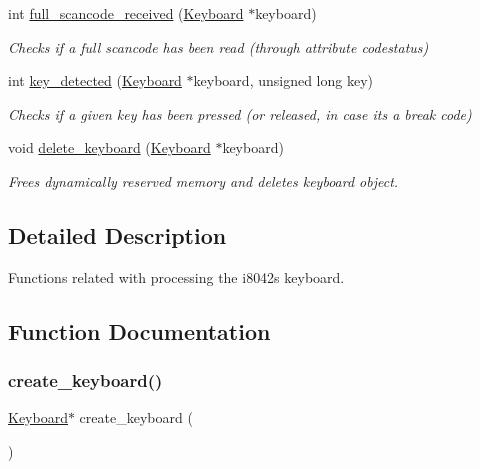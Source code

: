 \begin{DoxyCompactItemize}
int \hyperlink{group__keyboard_gacd892a0b56fcd859cc2ed0bc17e32d7f}{full\+\_\+scancode\+\_\+received} (\hyperlink{struct_keyboard}{Keyboard} $\ast$keyboard)
\begin{DoxyCompactList}\small\item\em Checks if a full scancode has been read (through attribute codestatus) \end{DoxyCompactList}\item 
int \hyperlink{group__keyboard_gaa472854b178776886c9bf568945db9c6}{key\+\_\+detected} (\hyperlink{struct_keyboard}{Keyboard} $\ast$keyboard, unsigned long key)
\begin{DoxyCompactList}\small\item\em Checks if a given key has been pressed (or released, in case it\textquotesingle{}s a break code) \end{DoxyCompactList}\item 
void \hyperlink{group__keyboard_ga8cbe117a33793a5f88056d37164af0a8}{delete\+\_\+keyboard} (\hyperlink{struct_keyboard}{Keyboard} $\ast$keyboard)
\begin{DoxyCompactList}\small\item\em Frees dynamically reserved memory and deletes keyboard \textquotesingle{}object\textquotesingle{}. \end{DoxyCompactList}\end{DoxyCompactItemize}


\subsection{Detailed Description}
Functions related with processing the i8042\textquotesingle{}s keyboard. 



\subsection{Function Documentation}
\hypertarget{group__keyboard_ga12648eff06090040743ce7b51875afec}{}\label{group__keyboard_ga12648eff06090040743ce7b51875afec} 
\subsubsection{\texorpdfstring{create\+\_\+keyboard()}{create\_keyboard()}}
{\footnotesize\ttfamily \hyperlink{struct_keyboard}{Keyboard}$\ast$ create\+\_\+keyboard (\begin{DoxyParamCaption}{ }\end{DoxyParamCaption})}



